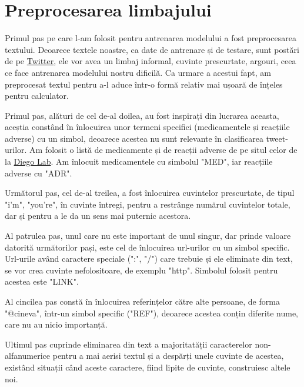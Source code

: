 \chapter{Preprocesarea limbajului}

Primul pas pe care l-am folosit pentru antrenarea modelului a fost preprocesarea textului.
Deoarece textele noastre, ca date de antrenare și de testare, sunt postări de pe \href{https://twitter.com/home}{Twitter},
ele vor avea un limbaj informal, cuvinte prescurtate, argouri, ceea ce face antrenarea modelului nostru
dificilă. Ca urmare a acestui fapt, am preprocesat textul pentru a-l aduce într-o formă relativ mai ușoară 
de înțeles pentru calculator.

Primul pas, alături de cel de-al doilea, au fost inspirați din lucrarea aceasta, aceștia constând în 
înlocuirea unor termeni specifici (medicamentele și reacțiile adverse) cu un simbol, deoarece acestea nu sunt
relevante în clasificarea tweet-urilor. Am folosit o listă
de medicamente și de reacții adverse de pe situl celor de la \href{http://diego.asu.edu/Publications/ADRClassify.html}{Diego Lab}.
Am înlocuit medicamentele cu simbolul "MED", iar reacțiile adverse cu "ADR".

Următorul pas, cel de-al treilea, a fost înlocuirea cuvintelor prescurtate, de tipul "i'm", "you're", în cuvinte întregi,
pentru a restrânge numărul cuvintelor totale, dar și pentru a le da un sens mai puternic acestora.

Al patrulea pas, unul care nu este important de unul singur, dar prinde valoare datorită următorilor pași, este
cel de înlocuirea url-urilor cu un simbol specific. Url-urile având caractere speciale (":", "/") care trebuie și 
ele eliminate din text, se vor crea cuvinte nefolositoare, de exemplu "http". Simbolul folosit pentru acestea este "LINK".

Al cincilea pas constă în înlocuirea referințelor către alte persoane, de forma "@cineva", într-un simbol specific ("REF"),
deoarece acestea conțin diferite nume, care nu au nicio importanță.

Ultimul pas cuprinde eliminarea din text a majoritatății caracterelor non-alfanumerice pentru a mai aerisi textul și a despărți unele cuvinte de acestea,
existând situații când aceste caractere, fiind lipite de cuvinte, construiesc altele noi.